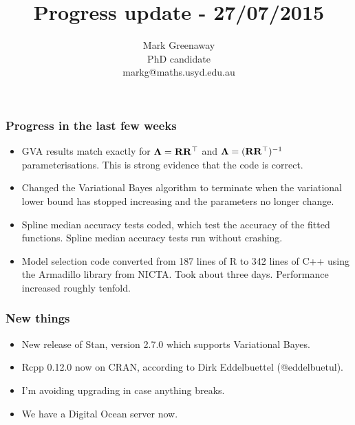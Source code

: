 \documentclass{beamer}
\title{Progress update - 27/07/2015}
\author{Mark Greenaway\\PhD candidate\\markg@maths.usyd.edu.au}
\begin{document}
\begin{frame}
\titlepage
\end{frame}

\begin{frame}
\frametitle{Progress in the last few weeks}
\begin{itemize}
\item GVA results match exactly for ${\boldsymbol \Lambda}={\bf R} {\bf R}^\top$ and ${\boldsymbol \Lambda}=({\bf R} {\bf R}^\top)^{-1}$
		  parameterisations. This is strong evidence that the code is correct.
\item Changed the Variational Bayes algorithm to terminate when the variational lower bound has
			stopped increasing and the parameters no longer change.
\item Spline median accuracy tests coded, which test the accuracy of the fitted functions.
			Spline median accuracy tests run without crashing.
\item Model selection code converted from 187 lines of R to 342 lines of C++ using the Armadillo
			library from NICTA. Took about three days. Performance increased roughly tenfold.
\end{itemize}
\end{frame}

\begin{frame}
\frametitle{New things}
\begin{itemize}
\item New release of Stan, version 2.7.0 which supports Variational Bayes.
\item Rcpp 0.12.0 now on CRAN, according to Dirk Eddelbuettel (@eddelbuetul).
\item I'm avoiding upgrading in case anything breaks.
\item We have a Digital Ocean server now.
\end{itemize}
\end{frame}
\end{document}
